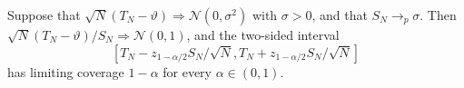 Suppose that
\(\sqrt N(T_N-\vartheta)\Rightarrow\mathcal N(0,\sigma^2)\) with
\(\sigma>0\), and that \(S_N\to_p\sigma\).  Then
\(\sqrt N(T_N-\vartheta)/S_N\Rightarrow\mathcal N(0,1)\), and the
two-sided interval
\[
\left[T_N-z_{1-\alpha/2}S_N/\sqrt N,
T_N+z_{1-\alpha/2}S_N/\sqrt N\right]
\]
has limiting coverage \(1-\alpha\) for every \(\alpha\in(0,1)\).